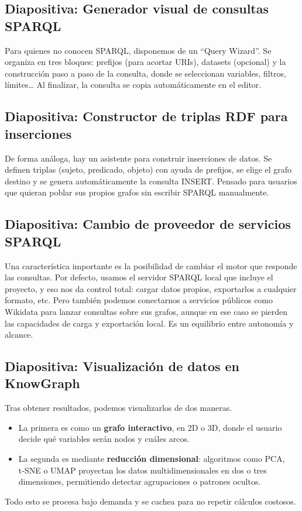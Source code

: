 \documentclass{article}
\begin{document}
\subsection*{Diapositiva: Generador visual de consultas SPARQL}
Para quienes no conocen SPARQL, disponemos de un “Query Wizard”. Se organiza en tres bloques: prefijos (para acortar URIs), datasets (opcional) y la construcción paso a paso de la consulta, donde se seleccionan variables, filtros, límites… Al finalizar, la consulta se copia automáticamente en el editor.

\subsection*{Diapositiva: Constructor de triplas RDF para inserciones}
De forma análoga, hay un asistente para construir inserciones de datos. Se definen triplas (sujeto, predicado, objeto) con ayuda de prefijos, se elige el grafo destino y se genera automáticamente la consulta INSERT. Pensado para usuarios que quieran poblar sus propios grafos sin escribir SPARQL manualmente.

\subsection*{Diapositiva: Cambio de proveedor de servicios SPARQL}
Una característica importante es la posibilidad de cambiar el motor que responde las consultas. Por defecto, usamos el servidor SPARQL local que incluye el proyecto, y eso nos da control total: cargar datos propios, exportarlos a cualquier formato, etc. Pero también podemos conectarnos a servicios públicos como Wikidata para lanzar consultas sobre sus grafos, aunque en ese caso se pierden las capacidades de carga y exportación local. Es un equilibrio entre autonomía y alcance.

\subsection*{Diapositiva: Visualización de datos en KnowGraph}
Tras obtener resultados, podemos visualizarlos de dos maneras.
\begin{itemize}
    \item La primera es como un \textbf{grafo interactivo}, en 2D o 3D, donde el usuario decide qué variables serán nodos y cuáles arcos.
    \item La segunda es mediante \textbf{reducción dimensional}: algoritmos como PCA, t‑SNE o UMAP proyectan los datos multidimensionales en dos o tres dimensiones, permitiendo detectar agrupaciones o patrones ocultos.
\end{itemize}
Todo esto se procesa bajo demanda y se cachea para no repetir cálculos costosos.
\end{document}
